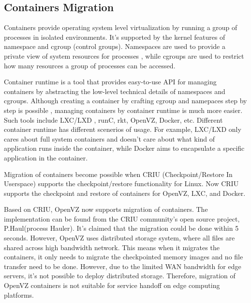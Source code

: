 \subsection{Containers Migration}

Containers provide operating system level virtualization by running a group of processes in isolated environments. It's supported by the kernel features of namespace 
 and cgroup (control groups)\cite{rosen2014container}.
Namespaces are used to provide a private view of system resources for processes \cite{pike1992plan9}, while cgroups are used to restrict how many resources a group of processes can be accessed\cite{rosen2013namespaceIntro}.  


Container runtime is a tool that provides easy-to-use API for managing containers by abstracting the low-level technical details of namespaces and cgroups. 
Although creating a container by crafting cgroup and namepaces step by step is possible \cite{conScratch}, managing containers by container runtime is much more easier.  Such tools include LXC/LXD\cite{LXC} ,
runC\cite{runc},
rkt\cite{rkt}, 
OpenVZ\cite{openvz}, 
Docker\cite{docker}, etc. Different container runtime has different scenerios of usage. For example, LXC/LXD only cares about full system containers and doesn't care about what kind of application runs inside the container, while Docker aims to encapsulate a specific application in the container.  

Migration of containers become possible when CRIU (Checkpoint/Restore In Userspace)\cite{criu} supports the checkpoint/restore functionality for Linux. 
Now CRIU supports the checkpoint and restore of containers for OpenVZ, LXC, and Docker. 


Based on CRIU, OpenVZ now supports migration of containers. The implementation can be found from the CRIU community's open source project, P.Haul(process Hauler)\cite{phaul}.  It's claimed that the migration could be done within 5 seconds\cite{livmigcon}.
However, OpenVZ uses distributed storage system\cite{openvzfs}, where all files are shared across high bandwidth network. 
This means when it migrates the containers, it only needs to migrate the checkpointed memory images and no file transfer need to be done. 
However, due to the limited WAN bandwidth for edge servers, it's not possible to deploy distributed storage. Therefore, migration of OpenVZ containers is not suitable for service handoff on edge computing platforms.

